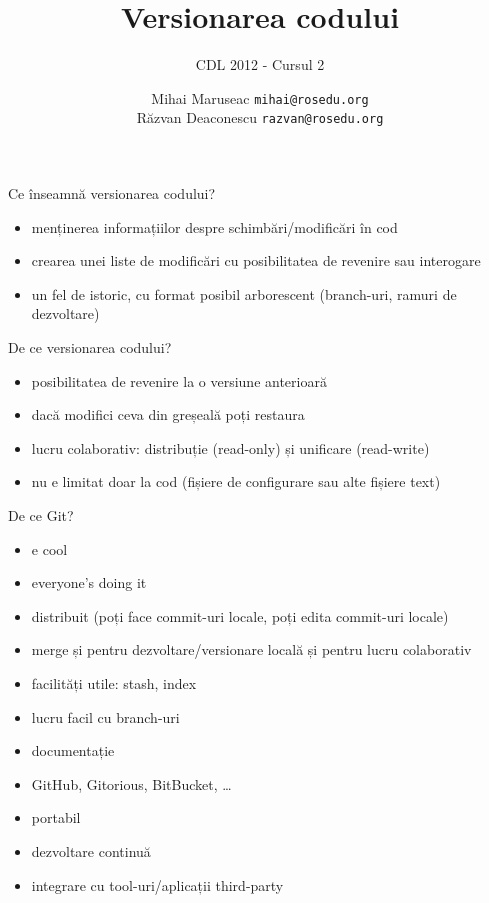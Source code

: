\documentclass{beamer}
\title[]{Versionarea codului}
\subtitle{CDL 2012 - Cursul 2}
\institute[]{ROSEdu}
\author[]{
  Mihai Maruseac \texttt{mihai@rosedu.org} \\
  Răzvan Deaconescu \texttt{razvan@rosedu.org}
}
\begin{document}
\maketitle

\begin{frame}{Ce înseamnă versionarea codului?}
  \begin{itemize}
    \item menținerea informațiilor despre schimbări/modificări în cod
    \item crearea unei liste de modificări cu posibilitatea de revenire sau
      interogare
    \item un fel de istoric, cu format posibil arborescent (branch-uri,
      ramuri de dezvoltare)
  \end{itemize}
\end{frame}

\begin{frame}{De ce versionarea codului?}
  \begin{itemize}
    \item posibilitatea de revenire la o versiune anterioară
    \item dacă modifici ceva din greșeală poți restaura
    \item lucru colaborativ: distribuție (read-only) și unificare (read-write)
    \item nu e limitat doar la cod (fișiere de configurare sau alte fișiere text)
  \end{itemize}
\end{frame}

\begin{frame}{De ce Git?}
  \begin{itemize}
    \item e cool
    \item everyone's doing it
    \item distribuit (poți face commit-uri locale, poți edita commit-uri
      locale)
    \item merge și pentru dezvoltare/versionare locală și pentru lucru
      colaborativ
    \item facilități utile: stash, index
    \item lucru facil cu branch-uri
    \item documentație
    \item GitHub, Gitorious, BitBucket, \ldots
    \item portabil
    \item dezvoltare continuă
    \item integrare cu tool-uri/aplicații third-party
  \end{itemize}
\end{frame}
\end{document}
